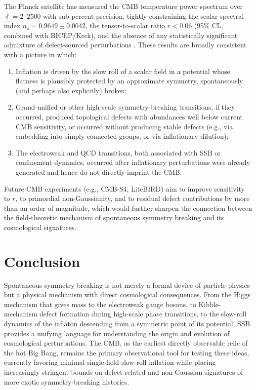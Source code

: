 \documentclass[11pt]{article}
\begin{document}
The Planck satellite has measured the CMB temperature power spectrum over $\ell = 2$--$2500$ with sub-percent precision, tightly constraining the scalar spectral index $n_s = 0.9649 \pm 0.0042$, the tensor-to-scalar ratio $r < 0.06$ (95\% CL, combined with BICEP/Keck), and the absence of any statistically significant admixture of defect-sourced perturbations \citep{Planck2018Inflation, BICEP2021}. These results are broadly consistent with a picture in which:
\begin{enumerate}
\item Inflation is driven by the slow roll of a scalar field in a potential whose flatness is plausibly protected by an approximate symmetry, spontaneously (and perhaps also explicitly) broken;
\item Grand-unified or other high-scale symmetry-breaking transitions, if they occurred, produced topological defects with abundances well below current CMB sensitivity, or occurred without producing stable defects (e.g., via embedding into simply connected groups, or via inflationary dilution);
\item The electroweak and QCD transitions, both associated with SSB or confinement dynamics, occurred after inflationary perturbations were already generated and hence do not directly imprint the CMB.
\end{enumerate}

Future CMB experiments (e.g., CMB-S4, LiteBIRD) aim to improve sensitivity to $r$, to primordial non-Gaussianity, and to residual defect contributions by more than an order of magnitude, which would further sharpen the connection between the field-theoretic mechanism of spontaneous symmetry breaking and its cosmological signatures.

\section{Conclusion}

Spontaneous symmetry breaking is not merely a formal device of particle physics but a physical mechanism with direct cosmological consequences. From the Higgs mechanism that gives mass to the electroweak gauge bosons, to Kibble-mechanism defect formation during high-scale phase transitions, to the slow-roll dynamics of the inflaton descending from a symmetric point of its potential, SSB provides a unifying language for understanding the origin and evolution of cosmological perturbations. The CMB, as the earliest directly observable relic of the hot Big Bang, remains the primary observational tool for testing these ideas, currently favoring minimal single-field slow-roll inflation while placing increasingly stringent bounds on defect-related and non-Gaussian signatures of more exotic symmetry-breaking histories.
\end{document}
